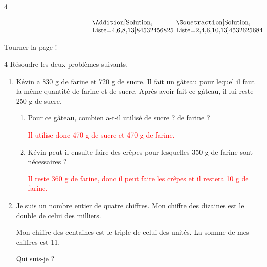 \documentclass[a4paper]{book}
\begin{document}
{\begin{exerciceNote}{4}
\begin{enumerate}[leftmargin=*]
            \medskip

            $\begin{array}{p{4cm}p{4cm}p{4cm}p{4cm}}
                &\Addition[Solution, Liste={4,6,8,13}]{84532}{456825}
                & \Soustraction[Solution, Liste={2,4,6,10,13}]{45326}{25684}
            \end{array}$
        \end{enumerate}       
    \end{exerciceNote}


    \vfill \hfill Tourner la page ! 
    

\newpage


    \begin{exerciceNote}{4}
        Résoudre les deux problèmes suivants.

        \begin{enumerate}[leftmargin=*]
            \item Kévin a 830 g de farine et 720 g de sucre. Il fait un gâteau pour lequel il faut la même quantité de farine et de sucre. Après avoir fait ce gâteau, il lui reste 250 g de sucre.
            \begin{enumerate}
                \item Pour ce gâteau, combien a-t-il utilisé de sucre ? de farine ?

                
                \textcolor{red}{Il utilise donc 470 g de sucre et 470 g de farine.}

                \item Kévin peut-il ensuite faire des crêpes pour lesquelles 350 g de farine sont nécessaires ?


                \textcolor{red}{Il reste 360 g de farine, donc il peut faire les crêpes et il restera 10 g de farine.}
            \end{enumerate}

            \item Je suis un nombre entier de quatre chiffres. Mon chiffre des dizaines est le double de celui des milliers.
            
            \og Mon chiffre des centaines est le triple de celui des unités. La somme de mes chiffres est 11.\fg 
            
            Qui suis-je ?
            

\end{enumerate}
\end{exerciceNote}}
\end{document}
